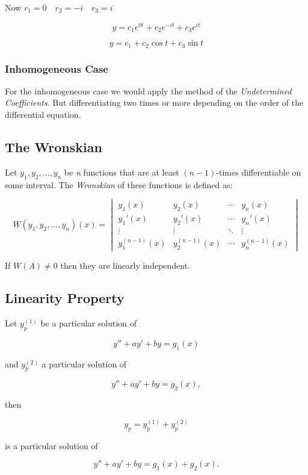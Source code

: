 Now \(r_1 = 0 \quad r_2 = -i \quad r_3 = i\)

\[
    y = c_1 e^{0t} + c_2 e^{-it} + c_3 e^{it}
\]

\[
    y = c_1 + c_2 \cos t + c_3 \sin t
\]

\subsubsection{Inhomogeneous Case}

For the inhomogeneous case we would apply the method of the \emph{Undetermined Coefficients}. But 
differentiating two times or more depending on the order of the differential equation.

\subsection{The Wronskian}

Let \( y_1, y_2, \ldots, y_n \) be \emph{n} functions that are at least 
\( (n-1) \)-times differentiable on some interval. The \emph{Wronskian} of these 
functions is defined as:

\[
    W(y_1, y_2, \ldots, y_n)(x) =
    \begin{vmatrix}
    y_1(x) & y_2(x) & \cdots & y_n(x) \\
    y_1'(x) & y_2'(x) & \cdots & y_n'(x) \\
    \vdots & \vdots & \ddots & \vdots \\
    y_1^{(n-1)}(x) & y_2^{(n-1)}(x) & \cdots & y_n^{(n-1)}(x)
    \end{vmatrix}
\]

If \(W(A) \ne 0\) then they are linearly independent.


\subsection{Linearity Property}

Let \( y_p^{(1)} \) be a particular solution of  

\[
    y'' + ay' + by = g_1(x)
\]  

and \( y_p^{(2)} \) a particular solution of  

\[
    y'' + ay' + by = g_2(x),
\]  

then  

\[
    y_p = y_p^{(1)} + y_p^{(2)}
\]  

is a particular solution of  

\[
    y'' + ay' + by = g_1(x) + g_2(x).
\]  

